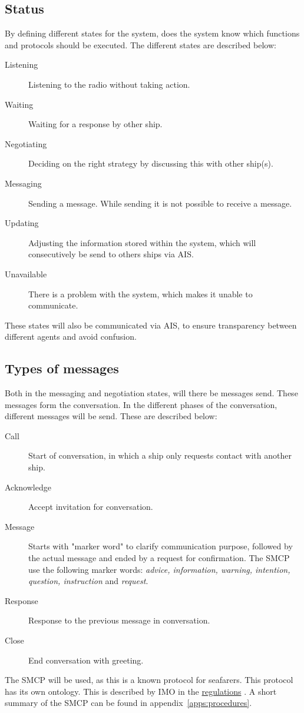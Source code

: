 \subsection{Status}
By defining different states for the system, does the system know which functions and protocols should be executed. The different states are described below:
\begin{description}
	\item [Listening] Listening to the radio without taking action.
	\item [Waiting] Waiting for a response by other ship.
	\item [Negotiating] Deciding on the right strategy by discussing this with other ship(s).
	\item [Messaging] Sending a message. While sending it is not possible to receive a message.
	\item [Updating] Adjusting the information stored within the system, which will consecutively be send to others ships via \ac{AIS}.
	\item [Unavailable] There is a problem with the system, which makes it unable to communicate.
\end{description}
These states will also be communicated via \ac{AIS}, to ensure transparency between different agents and avoid confusion.

\subsection{Types of messages}
Both in the messaging and negotiation states, will there be messages send. These messages form the conversation. In the different phases of the conversation, different messages will be send. These are described below:
\begin{description}
	\item [Call] Start of conversation, in which a ship only requests contact with another ship.
	\item [Acknowledge] Accept invitation for conversation.
	\item [Message] Starts with "marker word" to clarify communication purpose, followed by the actual message and ended by a request for confirmation. The \ac{SMCP} use the following marker words: \emph{advice, information, warning, intention, question, instruction} and \emph{request}.
	\item [Response] Response to the previous message in conversation.
	\item [Close] End conversation with greeting.
\end{description}
The \acf{SMCP} will be used, as this is a known protocol for seafarers. This protocol has its own ontology. This is described by \ac{IMO} in the \href{https://puc.overheid.nl/doc/PUC_1418_14/1/#16830}{regulations} \cite{IMO2000}. A short summary of the \ac{SMCP} can be found in appendix~\ref{apps:procedures}.

